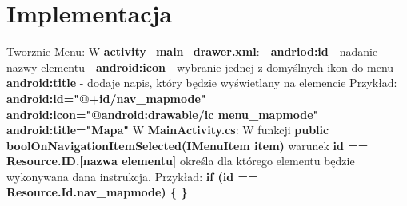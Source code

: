 	\newpage
\section{Implementacja}		%
Tworznie Menu: \newline
W \textbf{activity\_main\_drawer.xml}:
\newline
- \textbf{andriod:id} - nadanie nazwy elementu
\newline
- \textbf{android:icon} - wybranie jednej z domyślnych ikon do menu
\newline
- \textbf{android:title} - dodaje napis, który będzie wyświetlany na elemencie
\newline
Przykład:
\newline  
\textbf{android:id="@+id/nav\_mapmode" \newline
android:icon="@android:drawable/ic menu\_mapmode" \newline
android:title="Mapa"} \newline
W \textbf{MainActivity.cs}:
\newline
W funkcji \textbf{public boolOnNavigationItemSelected(IMenuItem item)} warunek \textbf{id == Resource.ID.[nazwa elementu]} określa dla którego elementu będzie wykonywana dana instrukcja. \newline
Przykład: \newline
\textbf{if (id == Resource.Id.nav\_mapmode) \newline
\{ \newline
  \newline
\}}
 


